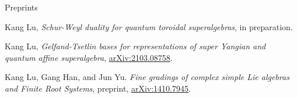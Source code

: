 \documentclass{resume} %
\begin{document}


\begin{rSection}{Preprints}
\begin{etaremune}[leftmargin=0cm]

\item Kang Lu, {\it Schur-Weyl duality for quantum toroidal superalgebras}, in preparation.

\item Kang Lu, {\it Gelfand-Tsetlin bases for representations of super Yangian and quantum affine superalgebra}, \href{https://arxiv.org/abs/2103.08758}{arXiv:2103.08758}.

\item Kang Lu, Gang Han, and Jun Yu.
{\it Fine gradings of complex simple Lie algebras and Finite Root Systems}, preprint, \href{https://arxiv.org/abs/1410.7945}{arXiv:1410.7945}. 
		
\end{etaremune}
\end{rSection}
\end{document}
